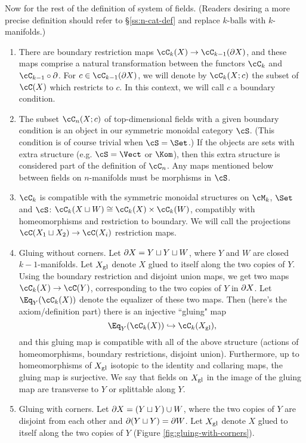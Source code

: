 Now for the rest of the definition of system of fields.
(Readers desiring a more precise definition should refer to \S\ref{ss:n-cat-def}
and replace $k$-balls with $k$-manifolds.)
\begin{enumerate}
\item There are boundary restriction maps $\cC_k(X) \to \cC_{k-1}(\bd X)$, 
and these maps comprise a natural
transformation between the functors $\cC_k$ and $\cC_{k-1}\circ\bd$.
For $c \in \cC_{k-1}(\bd X)$, we will denote by $\cC_k(X; c)$ the subset of 
$\cC(X)$ which restricts to $c$.
In this context, we will call $c$ a boundary condition.
\item The subset $\cC_n(X;c)$ of top-dimensional fields 
with a given boundary condition is an object in our symmetric monoidal category $\cS$.
(This condition is of course trivial when $\cS = \Set$.) 
If the objects are sets with extra structure (e.g. $\cS = \Vect$ or $\Kom$), 
then this extra structure is considered part of the definition of $\cC_n$.
Any maps mentioned below between fields on $n$-manifolds must be morphisms in $\cS$.
\item $\cC_k$ is compatible with the symmetric monoidal
structures on $\cM_k$, $\Set$ and $\cS$: $\cC_k(X \du W) \cong \cC_k(X)\times \cC_k(W)$,
compatibly with homeomorphisms and restriction to boundary.
We will call the projections $\cC(X_1 \du X_2) \to \cC(X_i)$
restriction maps.
\item Gluing without corners.
Let $\bd X = Y \du Y \du W$, where $Y$ and $W$ are closed $k{-}1$-manifolds.
Let $X\sgl$ denote $X$ glued to itself along the two copies of $Y$.
Using the boundary restriction and disjoint union
maps, we get two maps $\cC_k(X) \to \cC(Y)$, corresponding to the two
copies of $Y$ in $\bd X$.
Let $\Eq_Y(\cC_k(X))$ denote the equalizer of these two maps.
Then (here's the axiom/definition part) there is an injective ``gluing" map
\[
	\Eq_Y(\cC_k(X)) \hookrightarrow \cC_k(X\sgl) ,
\]
and this gluing map is compatible with all of the above structure (actions
of homeomorphisms, boundary restrictions, disjoint union).
Furthermore, up to homeomorphisms of $X\sgl$ isotopic to the identity 
and collaring maps,
the gluing map is surjective.
We say that fields on $X\sgl$ in the image of the gluing map
are transverse to $Y$ or splittable along $Y$.
\item Gluing with corners.
Let $\bd X = (Y \du Y) \cup W$, where the two copies of $Y$ 
are disjoint from each other and $\bd(Y\du Y) = \bd W$.
Let $X\sgl$ denote $X$ glued to itself along the two copies of $Y$
(Figure \ref{fig:gluing-with-corners}).
\begin{figure}[t]
\begin{center}
\begin{tikzpicture}


\end{tikzpicture}
\end{center}
\end{figure}
\end{enumerate}
